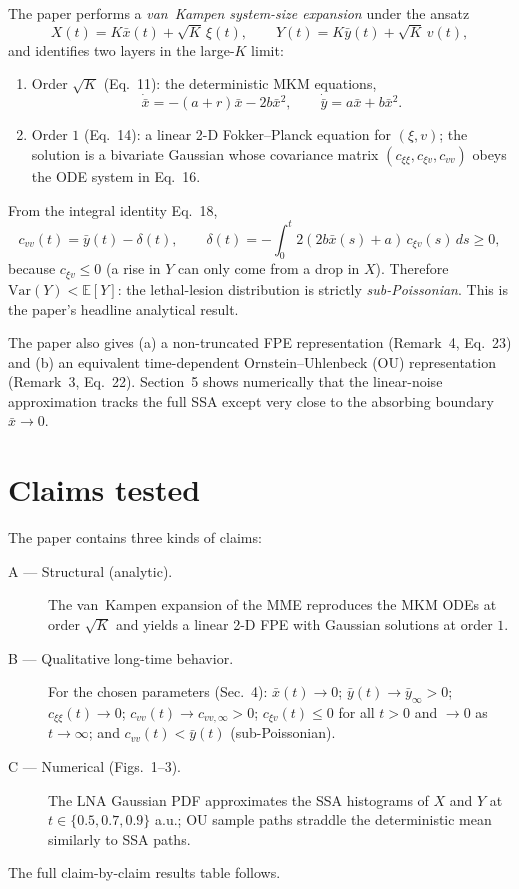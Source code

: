 \documentclass[11pt]{article}
\begin{document}
The paper performs a \emph{van~Kampen system-size expansion} under the ansatz
\[
X(t) = K\bar x(t) + \sqrt K\,\xi(t), \qquad Y(t) = K\bar y(t) + \sqrt K\,v(t),
\]
and identifies two layers in the large-$K$ limit:
\begin{enumerate}
  \item Order $\sqrt K$ (Eq.~11): the deterministic MKM equations,
  \[
  \dot{\bar x} = -(a+r)\bar x - 2b\bar x^2, \qquad \dot{\bar y} = a\bar x + b\bar x^2.
  \]
  \item Order $1$ (Eq.~14): a linear 2-D Fokker--Planck equation for $(\xi,v)$; the solution is a bivariate Gaussian whose covariance matrix $(c_{\xi\xi}, c_{\xi v}, c_{vv})$ obeys the ODE system in Eq.~16.
\end{enumerate}
From the integral identity Eq.~18,
\[
c_{vv}(t) = \bar y(t) - \delta(t), \qquad \delta(t) = -\int_0^t 2(2b\bar x(s) + a)\, c_{\xi v}(s)\, ds \ge 0,
\]
because $c_{\xi v}\le 0$ (a rise in $Y$ can only come from a drop in $X$).  Therefore $\mathrm{Var}(Y)<\mathbb E[Y]$: the lethal-lesion distribution is strictly \emph{sub-Poissonian}.  This is the paper's headline analytical result.

The paper also gives (a) a non-truncated FPE representation (Remark~4, Eq.~23) and (b) an equivalent time-dependent Ornstein--Uhlenbeck (OU) representation (Remark~3, Eq.~22).  Section~5 shows numerically that the linear-noise approximation tracks the full SSA except very close to the absorbing boundary $\bar x \to 0$.

\section{Claims tested}

The paper contains three kinds of claims:
\begin{description}
  \item[A --- Structural (analytic).] The van~Kampen expansion of the MME reproduces the MKM ODEs at order $\sqrt K$ and yields a linear 2-D FPE with Gaussian solutions at order $1$.
  \item[B --- Qualitative long-time behavior.] For the chosen parameters (Sec.~4): $\bar x(t)\to 0$; $\bar y(t)\to \bar y_\infty>0$; $c_{\xi\xi}(t)\to 0$; $c_{vv}(t)\to c_{vv,\infty}>0$; $c_{\xi v}(t)\le 0$ for all $t>0$ and $\to 0$ as $t\to\infty$; and $c_{vv}(t)<\bar y(t)$ (sub-Poissonian).
  \item[C --- Numerical (Figs.\ 1--3).] The LNA Gaussian PDF approximates the SSA histograms of $X$ and $Y$ at $t\in\{0.5,0.7,0.9\}$ a.u.; OU sample paths straddle the deterministic mean similarly to SSA paths.
\end{description}
The full claim-by-claim results table follows.
\end{document}
